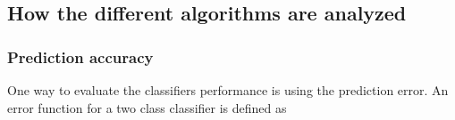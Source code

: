         
        
    
        
        
        
    \subsection{How the different algorithms are analyzed}
        \subsubsection{Prediction accuracy}
            One way to evaluate the classifiers performance is using the prediction error. An error function for a two class classifier is defined as
            
